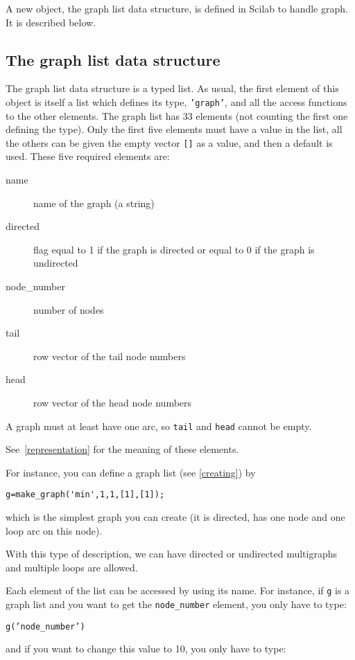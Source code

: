 \documentclass[11pt]{article}
\begin{document}
A new object, the graph list data structure, is defined in
Scilab to handle graph. It is described below.

\subsection{The graph list data structure} \label{graph-list}

The graph list data structure is a typed list. 
As usual, the first element of this object is itself a list which
defines its 
type, \texttt{'graph'}, 
and all the access functions to the other elements.
The graph list has 33 elements (not counting the first one defining the type).
Only the first five elements must have a value in the list,
all the others can be given the empty vector \texttt{[]} as a value, and then a
default is used. These five required elements are:
\begin{description}
  \item[name] name of the graph (a string)
  \item[directed] flag equal to 1 if the graph is directed or equal
  to 0 if the graph is undirected
  \item[node\_number] number of nodes
  \item[tail] row vector of the tail node numbers
  \item[head] row vector of the head node numbers
\end{description}

A graph must at least have one arc, so \texttt{tail} and \texttt{head}
cannot be empty. 

See~\ref{representation} for the meaning of these elements.

For instance, you can define a graph list (see \ref{creating}) by
\begin{verbatim}
g=make_graph('min',1,1,[1],[1]);
\end{verbatim}
which is the simplest graph you can create (it is directed, has 
one node and one loop arc on this node).

With this type of description, we can have directed or undirected
multigraphs and multiple loops are allowed.

Each element of the list can be accessed by using its name.
For instance, if \texttt{g} is a graph list and
you want to get the \texttt{node\_number} element, you only have to type:

\texttt{g('node\_number')}

and if you want to change this value to 10, you only have to type:
\end{document}
